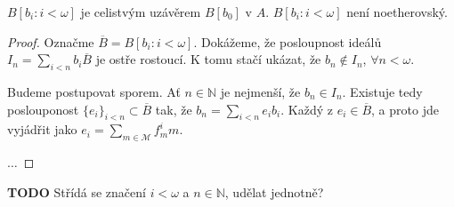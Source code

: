 \documentclass[11pt,a4paper]{article}
\newcommand\m[1]{\mathbb { #1 }} %
\newcommand\p[1]{\mathcal{ #1 }} %
\theoremstyle{definition}
\theoremstyle{plain}
\begin{document}
\veta $B[b_i : i < \omega]$ je celistvým uzávěrem $B[b_0]$ v $A$.
\veta $B[b_i : i < \omega]$ není noetherovský.
\begin{proof}
Označme $\overline{B} = B[b_i : i < \omega]$. Dokážeme, že posloupnost ideálů
$I_n = \sum_{i < n} b_i \overline{B}$ je ostře rostoucí. K tomu stačí ukázat,
že $b_n \notin I_n$, $\forall n < \omega$.

Budeme postupovat sporem. Ať $n \in \m N$ je nejmenší, že $b_n \in I_n$. Existuje
tedy poslouponost $\{e_i\}_{i < n} \subset \overline B$ tak, že $b_n = \sum_{i
< n} e_i b_i$. Každý z $e_i \in \overline B$, a proto jde vyjádřit jako $e_i =
\sum_{m \in \p M} f^i_m m$.

$\dots$
\end{proof}

\textbf{TODO} Střídá se značení $i < \omega$ a $n \in \m N$, udělat jednotně?
\end{document}
